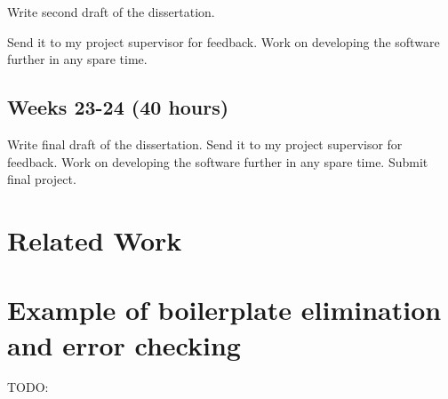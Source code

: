 \documentclass[11pt]{article}
\begin{document}
Write second draft of the dissertation.

Send it to my project supervisor for feedback. Work on developing the software
further in any spare time.


\subsection{Weeks 23-24 (40 hours)}

Write final draft of the dissertation. Send it to my project supervisor for
feedback. Work on developing the software further in any spare time. Submit
final project.

\section{Related Work}

\section{Example of boilerplate elimination and error checking}

TODO:
\end{document}
